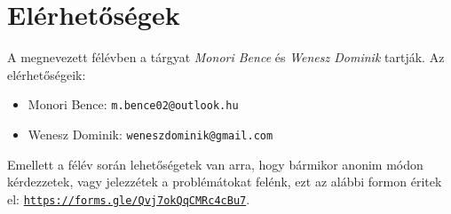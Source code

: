 \documentclass[12pt,a4paper]{article}
\begin{document}
\section{Elérhetőségek}
A megnevezett félévben a tárgyat \textit{Monori Bence} és \textit{Wenesz Dominik} tartják. Az elérhetőségeik:
\begin{itemize}
    \item Monori Bence: \texttt{m.bence02@outlook.hu}
    \item Wenesz Dominik: \texttt{weneszdominik@gmail.com}
\end{itemize}
Emellett a félév során lehetőségetek van arra, hogy bármikor anonim módon kérdezzetek, vagy jelezzétek a problémátokat felénk, ezt az alábbi formon éritek el: \texttt{\url{https://forms.gle/Qvj7okQqCMRc4cBu7}}.
\end{document}
